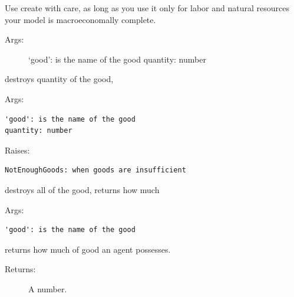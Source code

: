 \documentclass[letterpaper,10pt,english]{sphinxmanual}
\begin{document}
\begin{fulllineitems}
\begin{fulllineitems}
Use create with care, as long as you use it only for labor and
natural resources your model is macroeconomally complete.
\begin{description}
\item[{Args:}] \leavevmode
`good': is the name of the good
quantity: number

\end{description}

\end{fulllineitems}


\begin{fulllineitems}
\label{Agent_class:abce.Agent.destroy}
destroys quantity of the good,

Args:

\begin{Verbatim}[commandchars=\\\{\}]
'good': is the name of the good
quantity: number
\end{Verbatim}

Raises:

\begin{Verbatim}[commandchars=\\\{\}]
NotEnoughGoods: when goods are insufficient
\end{Verbatim}

\end{fulllineitems}


\begin{fulllineitems}
\label{Agent_class:abce.Agent.destroy_all}
destroys all of the good, returns how much

Args:

\begin{Verbatim}[commandchars=\\\{\}]
'good': is the name of the good
\end{Verbatim}

\end{fulllineitems}


\begin{fulllineitems}
\label{Agent_class:abce.Agent.possession}
returns how much of good an agent possesses.
\begin{description}
\item[{Returns:}] \leavevmode
A number.


\end{description}
\end{fulllineitems}
\end{fulllineitems}
\end{document}
